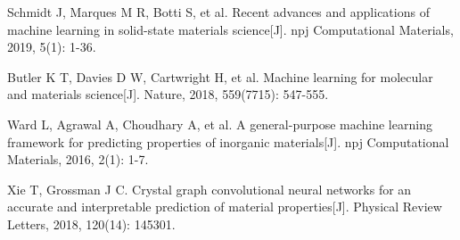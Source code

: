 \documentclass[12pt,a4paper]{article}
\begin{document}
\begin{thebibliography}{99}
Schmidt J, Marques M R, Botti S, et al. Recent advances and applications of machine learning in solid-state materials science[J]. npj Computational Materials, 2019, 5(1): 1-36.

Butler K T, Davies D W, Cartwright H, et al. Machine learning for molecular and materials science[J]. Nature, 2018, 559(7715): 547-555.

Ward L, Agrawal A, Choudhary A, et al. A general-purpose machine learning framework for predicting properties of inorganic materials[J]. npj Computational Materials, 2016, 2(1): 1-7.

Xie T, Grossman J C. Crystal graph convolutional neural networks for an accurate and interpretable prediction of material properties[J]. Physical Review Letters, 2018, 120(14): 145301.

\end{thebibliography}
\end{document}
